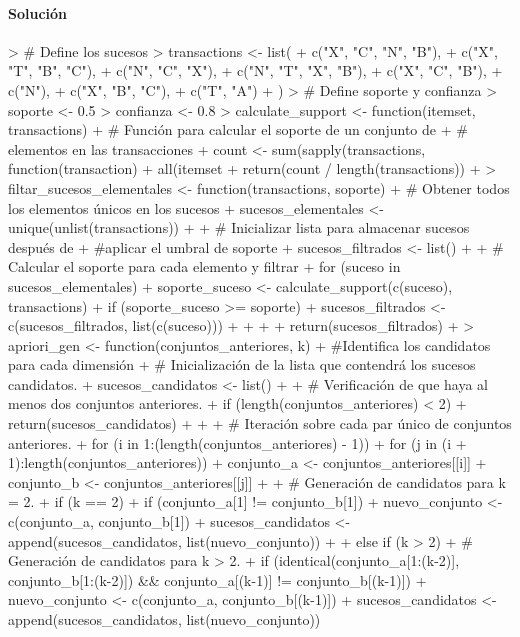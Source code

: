 \documentclass[a4paper, 12pt]{article}
\begin{document}
	\paragraph{Solución}
\begin{Schunk}
\begin{Sinput}
> # Define los sucesos
> transactions <- list(
+ 	c("X", "C", "N", "B"),
+ 	c("X", "T", "B", "C"),
+ 	c("N", "C", "X"),
+ 	c("N", "T", "X", "B"),
+ 	c("X", "C", "B"),
+ 	c("N"),
+ 	c("X", "B", "C"),
+ 	c("T", "A")
+ )
> # Define soporte y confianza
> soporte <- 0.5
> confianza <- 0.8
> calculate_support <- function(itemset, transactions) {
+ 	# Función para calcular el soporte de un conjunto de 
+ 	# elementos en las transacciones
+ 	count <- sum(sapply(transactions, function(transaction) 
+ 	all(itemset %
+ 	return(count / length(transactions))
+ }
> filtar_sucesos_elementales <- function(transactions, soporte) {
+ 	# Obtener todos los elementos únicos en los sucesos
+ 	sucesos_elementales <- unique(unlist(transactions))
+ 
+ 	# Inicializar lista para almacenar sucesos después de 
+ 	#aplicar el umbral de soporte
+ 	sucesos_filtrados <- list()
+ 
+ 	# Calcular el soporte para cada elemento y filtrar
+ 	for (suceso in sucesos_elementales) {
+ 	soporte_suceso <- calculate_support(c(suceso), transactions)
+ 	if (soporte_suceso >= soporte) {
+ 		sucesos_filtrados <- c(sucesos_filtrados, list(c(suceso)))
+ 	}
+ 	}
+ 
+ 	return(sucesos_filtrados)
+ }
> apriori_gen <- function(conjuntos_anteriores, k) {
+ 	#Identifica los candidatos para cada dimensión
+ 	# Inicialización de la lista que contendrá los sucesos candidatos.
+ 	sucesos_candidatos <- list()
+ 
+   # Verificación de que haya al menos dos conjuntos anteriores.
+   if (length(conjuntos_anteriores) < 2) {
+     return(sucesos_candidatos)
+   }
+   
+   # Iteración sobre cada par único de conjuntos anteriores.
+   for (i in 1:(length(conjuntos_anteriores) - 1)) {
+     for (j in (i + 1):length(conjuntos_anteriores)) {
+ 	  conjunto_a <- conjuntos_anteriores[[i]]
+ 	  conjunto_b <- conjuntos_anteriores[[j]]
+ 
+ 	  # Generación de candidatos para k = 2.
+ 	  if (k == 2) {
+ 	    if (conjunto_a[1] != conjunto_b[1]) {
+ 		  nuevo_conjunto <- c(conjunto_a, conjunto_b[1])
+ 		  sucesos_candidatos <- append(sucesos_candidatos, list(nuevo_conjunto))
+ 	    }
+ 	  } else if (k > 2) {
+ 	    # Generación de candidatos para k > 2.
+ 	    if (identical(conjunto_a[1:(k-2)], conjunto_b[1:(k-2)]) && conjunto_a[(k-1)] != conjunto_b[(k-1)]) {
+ 		  nuevo_conjunto <- c(conjunto_a, conjunto_b[(k-1)])
+ 		  sucesos_candidatos <- append(sucesos_candidatos, list(nuevo_conjunto))
}}}}}
\end{Sinput}
\end{Schunk}
\end{document}
